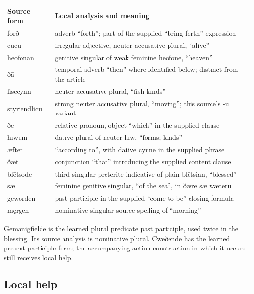 \par\begingroup
\fontsize{10.5}{13.2}\selectfont
\setlength{\LTleft}{0pt}\setlength{\LTright}{\fill}
\noindent
\begin{tabular}{@{}>{\raggedright\arraybackslash}p{27.91mm}>{\raggedright\arraybackslash}p{93.28mm}@{}}
\toprule
\textbf{Source form} & \textbf{Local analysis and meaning} \\
\midrule
forð & adverb “forth”; part of the supplied “bring forth” expression \\
cucu & irregular adjective, neuter accusative plural, “alive” \\
heofonan & genitive singular of weak feminine heofone, “heaven” \\
ðā & temporal adverb “then” where identified below; distinct from the article \\
fisccynn & neuter accusative plural, “fish-kinds” \\
styriendlicu & strong neuter accusative plural, “moving”; this source’s -u variant \\
ðe & relative pronoun, object “which” in the supplied clause \\
hīwum & dative plural of neuter hīw, “forms; kinds” \\
æfter & “according to”, with dative cynne in the supplied phrase \\
ðæt & conjunction “that” introducing the supplied content clause \\
blētsode & third-singular preterite indicative of plain blētsian, “blessed” \\
sǣ & feminine genitive singular, “of the sea”, in ðǣre sǣ wæteru \\
geworden & past participle in the supplied “come to be” closing formula \\
męrgen & nominative singular source spelling of “morning” \\
\bottomrule
\end{tabular}
\par\endgroup

Gemanigfielde is the learned plural predicate past participle, used twice in the blessing. Its source analysis is nominative plural. Cweðende has the learned present-participle form; the accompanying-action construction in which it occurs still receives local help.

\subsection*{Local help}

